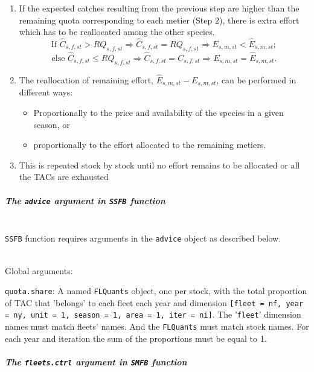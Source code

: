 \begin{enumerate}
    \item If the expected catches resulting from the previous step are higher than the remaining quota corresponding to
    each metier (Step 2), there is extra effort which has to be reallocated among the other species.
        $$\text{If   } \hat C_{s,f,st} > RQ_{s,f,st} \Rightarrow 
                        \hat C_{s,f,st} = RQ_{s,f,st} \Rightarrow E_{s,m,st} < \hat E_{s,m,st}; $$
       	$$\text{else } \hat C_{s,f,st} \leq RQ_{s,f,st} \Rightarrow
                        \hat C_{s,f,st} = C_{s,f,st} \Rightarrow E_{s,m,st} = \hat E_{s,m,st}.$$

    \item The reallocation of remaining effort, $\hat E_{s,m,st} - E_{s,m,st}$, can be performed in different ways:
      \begin{itemize}
        \item Proportionally to the price and availability of the species in a given season, or
        \item proportionally to the effort allocated to the remaining metiers.
      \end{itemize}
    
    \item This is repeated stock by stock until no effort remains to be allocated or all the TACs are exhausted

  \end{enumerate}
  
\subparagraph{The \texttt{advice} argument in \texttt{SSFB} function}
\quad\\

  \texttt{SSFB} function requires arguments in the \texttt{advice} object as described below.

  \quad\\
  \noindent Global arguments:
  \begin{description}
  	\item \texttt{quota.share}: A named \texttt{FLQuants} object, one per stock, with the total proportion of TAC that 'belongs' to 
  		each fleet each year and dimension \texttt{[fleet = nf, year = ny, unit = 1, season = 1, area = 1, iter = ni]}. The '\texttt{fleet}' dimension names must match fleets' names. And the \texttt{FLQuants} must match stock names. 
  		For each year and iteration the sum of the proportions must be equal to 1. 
  \end{description}

\subparagraph{The \texttt{fleets.ctrl} argument in \texttt{SMFB} function}
\quad\\

